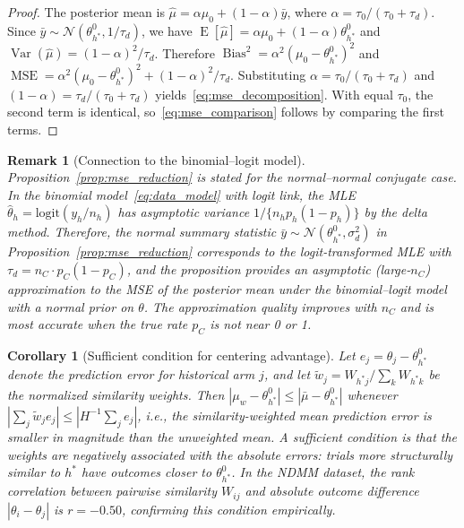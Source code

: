 \documentclass[12pt]{article}
\newtheorem{corollary}{Corollary}
\newtheorem{remark}{Remark}
\begin{document}
\begin{proof}
The posterior mean is $\hat{\mu} = \alpha \mu_0 + (1 - \alpha) \bar{y}$, where $\alpha = \tau_0 / (\tau_0 + \tau_d)$. Since $\bar{y} \sim \mathcal{N}(\theta_{h^*}^0, 1/\tau_d)$, we have $\operatorname{E}[\hat{\mu}] = \alpha \mu_0 + (1 - \alpha) \theta_{h^*}^0$ and $\operatorname{Var}(\hat{\mu}) = (1-\alpha)^2 / \tau_d$. Therefore $\operatorname{Bias}^2 = \alpha^2 (\mu_0 - \theta_{h^*}^0)^2$ and $\operatorname{MSE} = \alpha^2 (\mu_0 - \theta_{h^*}^0)^2 + (1-\alpha)^2 / \tau_d$. Substituting $\alpha = \tau_0/(\tau_0 + \tau_d)$ and $(1-\alpha) = \tau_d/(\tau_0 + \tau_d)$ yields~\eqref{eq:mse_decomposition}. With equal $\tau_0$, the second term is identical, so~\eqref{eq:mse_comparison} follows by comparing the first terms.
\end{proof}

\begin{remark}[Connection to the binomial--logit model]
\label{rem:logit_connection}
Proposition~\ref{prop:mse_reduction} is stated for the normal--normal conjugate case. In the binomial model~\eqref{eq:data_model} with logit link, the MLE $\hat{\theta}_h = \text{logit}(y_h / n_h)$ has asymptotic variance $1/\{n_h p_h(1-p_h)\}$ by the delta method. Therefore, the normal summary statistic $\bar{y} \sim \mathcal{N}(\theta_{h^*}^0, \sigma_d^2)$ in Proposition~\ref{prop:mse_reduction} corresponds to the logit-transformed MLE with $\tau_d = n_C \cdot p_C(1 - p_C)$, and the proposition provides an asymptotic (large-$n_C$) approximation to the MSE of the posterior mean under the binomial--logit model with a normal prior on $\theta$. The approximation quality improves with $n_C$ and is most accurate when the true rate $p_C$ is not near 0 or 1.
\end{remark}

\begin{corollary}[Sufficient condition for centering advantage]
\label{cor:centering}
Let $e_j = \theta_j - \theta_{h^*}^0$ denote the prediction error for historical arm $j$, and let $\tilde{w}_j = W_{h^*j} / \sum_k W_{h^*k}$ be the normalized similarity weights. Then $|\mu_w - \theta_{h^*}^0| \leq |\bar{\mu} - \theta_{h^*}^0|$ whenever $|\sum_j \tilde{w}_j e_j| \leq |H^{-1} \sum_j e_j|$, i.e., the similarity-weighted mean prediction error is smaller in magnitude than the unweighted mean. A sufficient condition is that the weights are negatively associated with the absolute errors: trials more structurally similar to $h^*$ have outcomes closer to $\theta_{h^*}^0$. In the NDMM dataset, the rank correlation between pairwise similarity $W_{ij}$ and absolute outcome difference $|\theta_i - \theta_j|$ is $r = -0.50$, confirming this condition empirically.
\end{corollary}
\end{document}
